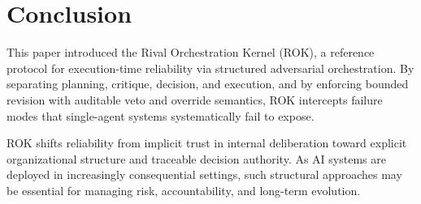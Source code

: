 \section*{Conclusion}

This paper introduced the Rival Orchestration Kernel (ROK), a reference protocol for execution-time reliability via structured adversarial orchestration. By separating planning, critique, decision, and execution, and by enforcing bounded revision with auditable veto and override semantics, ROK intercepts failure modes that single-agent systems systematically fail to expose.

ROK shifts reliability from implicit trust in internal deliberation toward explicit organizational structure and traceable decision authority. As AI systems are deployed in increasingly consequential settings, such structural approaches may be essential for managing risk, accountability, and long-term evolution.

